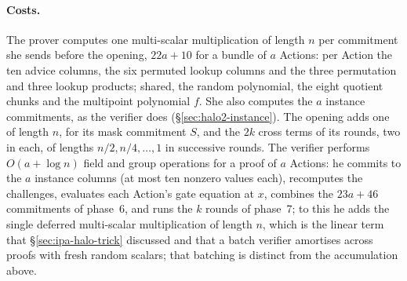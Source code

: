 \documentclass[11pt,a4paper]{article}
\theoremstyle{definition}
\begin{document}
\paragraph{Costs.}
The prover computes one multi-scalar multiplication of length $n$ per
commitment she sends before the opening, $22a + 10$ for a bundle of $a$
Actions: per Action
the ten advice columns, the six permuted lookup columns and the three
permutation and three lookup products; shared, the random polynomial,
the eight quotient chunks and the multipoint polynomial $f$. She also
computes the $a$ instance commitments, as the verifier does
(\S\ref{sec:halo2-instance}). The opening adds one of length $n$, for its mask
commitment $S$, and the $2k$ cross terms of its rounds, two in each, of lengths
$n/2, n/4, \dots, 1$ in successive rounds. The verifier performs $O(a + \log n)$
field and group operations for a proof of $a$ Actions: he commits to the $a$
instance columns (at most ten nonzero values each),
recomputes the challenges, evaluates each Action's gate equation at $x$,
combines the $23a + 46$ commitments of phase~6, and runs the $k$ rounds of
phase~7; to this he adds the single deferred multi-scalar multiplication of
length $n$, which is the linear term that \S\ref{sec:ipa-halo-trick} discussed
and that a batch verifier amortises across proofs with fresh random scalars;
that batching is distinct from the accumulation above.
\end{document}
